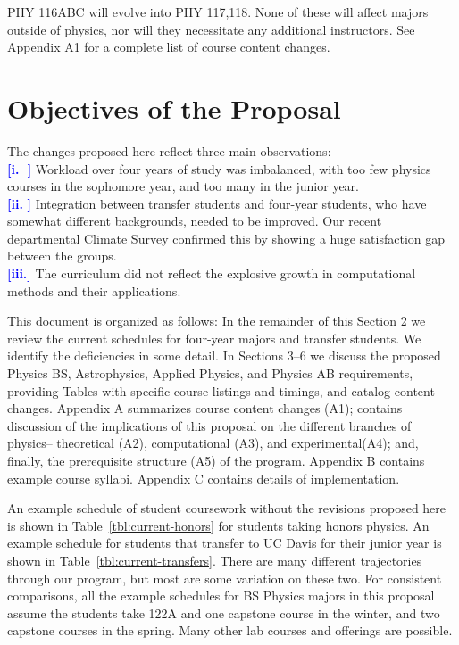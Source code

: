 \documentclass[12pt]{article}
\newcommand{\tcb}{\textcolor{blue}}
\begin{document}
PHY 116ABC will evolve into PHY 117,118.
None of these will affect majors outside of physics,
nor will they necessitate any additional instructors.
See Appendix A1 for a complete list of course content changes.

\section{Objectives of the Proposal}


The changes proposed here reflect three main observations: \\
\tcb{\bf [i.\,\,\,\,]}  Workload over four years of study was imbalanced, with too few physics
courses in the sophomore year, and too many in the junior year. \\
\tcb{\bf [ii.\,\,]}  
Integration between transfer students and
four-year students, who have somewhat different backgrounds, needed to be
improved. Our recent departmental Climate Survey confirmed this by showing a
huge satisfaction gap between the groups. \\
\tcb{\bf [iii.]}  The curriculum did not reflect the explosive growth
in computational methods and their applications.

This document is organized as follows:  In the remainder of this
Section 2 we review the
current schedules for four-year majors and transfer students.  We
identify the deficiencies in some detail.  In Sections 3--6 we discuss
the proposed Physics BS, Astrophysics, Applied Physics, and Physics AB 
requirements, providing Tables with specific
course listings and timings, and catalog content changes.
Appendix A summarizes course content changes (A1); 
contains discussion of the implications of
this proposal on the different branches of physics-- theoretical (A2), 
computational (A3), and experimental(A4); 
and, finally, the prerequisite structure (A5) of
the program.
Appendix B contains example course syllabi.
Appendix C contains details of implementation.


An example schedule of student coursework without the revisions
proposed here is shown in Table~\ref{tbl:current-honors} for students
taking honors physics.  An example schedule for students that transfer
to UC Davis for their junior year is shown in
Table~\ref{tbl:current-transfers}.  There are many different
trajectories through our program, but most are some variation on these
two.  For consistent comparisons, all the example schedules for BS
Physics majors in this proposal assume the students take 122A and one
capstone course in the winter, and two capstone courses in the spring.
Many other lab courses and offerings are possible.
\end{document}
